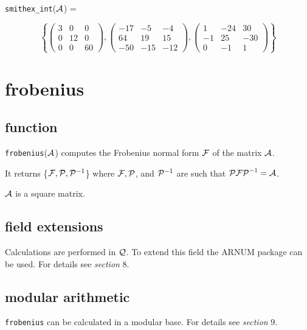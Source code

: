 {\tt smithex\_int}(${\cal A}$) = 
\begin{center}
\begin{displaymath}
\left\{ \left( \begin{array}{ccc} 3 & 0 & 0 \\ 0 & 12 & 0 \\ 0 & 0 & 60 
\end{array} \right), \left( \begin{array}{ccc} -17 & -5 & -4 \\ 64 & 19 
& 15 \\ -50 & -15 & -12 \end{array} \right), \left( \begin{array}{ccc} 
1 & -24 & 30 \\ -1 & 25 & -30 \\ 0 & -1 & 1 \end{array} \right) \right\}
\end{displaymath}
\end{center}


\section{frobenius}

\subsection{function}

{\tt frobenius}(${\cal A}$) computes the Frobenius normal form 
${\cal F}$ of the matrix ${\cal A}$.

It returns \{${\cal F}, {\cal P}, {\cal P}^{-1}$\} where ${\cal F}, 
{\cal P}$, and ${\cal P}^{-1}$ are such that ${\cal P F P}^{-1} = 
{\cal A}$.

${\cal A}$ is a square matrix.

\subsection{field extensions}

Calculations are performed in ${\cal Q}$. To extend this field the 
{\small ARNUM} package can be used. For details see {\it section} 8.

\subsection{modular arithmetic}

{\tt frobenius} can be calculated in a modular base. For details see 
{\it section} 9.

